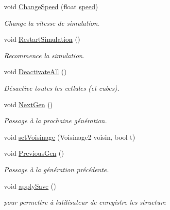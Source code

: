 \begin{DoxyCompactItemize}
void \mbox{\hyperlink{class_simulation_a3fde1a020def21f5f41794735b76c686}{Change\+Speed}} (float \mbox{\hyperlink{class_simulation_a4e347114640730fa13c37ef9aa295d5c}{speed}})
\begin{DoxyCompactList}\small\item\em Change la vitesse de simulation. \end{DoxyCompactList}\item 
void \mbox{\hyperlink{class_simulation_a500982098740ae238f349a6fed0affd8}{Restart\+Simulation}} ()
\begin{DoxyCompactList}\small\item\em Recommence la simulation. \end{DoxyCompactList}\item 
void \mbox{\hyperlink{class_simulation_abc1bd1d93c293257a921a8a8935095b6}{Deactivate\+All}} ()
\begin{DoxyCompactList}\small\item\em Désactive toutes les cellules (et cubes). \end{DoxyCompactList}\item 
void \mbox{\hyperlink{class_simulation_a6027638c71846ed03d560cd75d8a92d6}{Next\+Gen}} ()
\begin{DoxyCompactList}\small\item\em Passage à la prochaine génération. \end{DoxyCompactList}\item 
void \mbox{\hyperlink{class_simulation_a9238f4dcd56a4945017fda48a76a3dc8}{set\+Voisinage}} (Voisinage2 voisin, bool t)
\item 
void \mbox{\hyperlink{class_simulation_a2af29808f03940f4a8824c926f8c8cf9}{Previous\+Gen}} ()
\begin{DoxyCompactList}\small\item\em Passage à la génération précédente. \end{DoxyCompactList}\item 
void \mbox{\hyperlink{class_simulation_aee60f7c0cce0789d82fe7a324f1fbffd}{apply\+Save}} ()
\begin{DoxyCompactList}\small\item\em pour permettre à l\textquotesingle{}utilisateur de enregistre les structure \end{DoxyCompactList}\end{DoxyCompactItemize}

